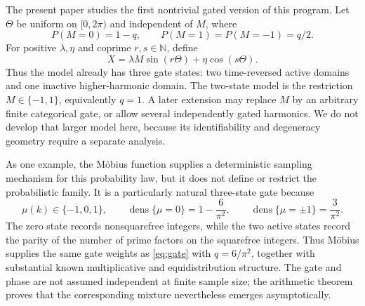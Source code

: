 \documentclass[11pt]{amsart}
\numberwithin{equation}{section}\setcounter{tocdepth}{3}\setcounter{secnumdepth}{3}
\begin{document}
The present paper studies the first nontrivial gated version of this program.  Let
$\Theta$ be uniform on $[0,2\pi)$ and independent of $M$, where
\begin{equation}P(M=0)=1-q,\qquad P(M=1)=P(M=-1)=q/2.\label{eq:gate}\end{equation}
For positive $\lambda,\eta$ and coprime $r,s\in\mathbb N$, define
\begin{equation}X=\lambda M\sin(r\Theta)+\eta\cos(s\Theta).\label{eq:X}\end{equation}
Thus the model already has three gate states: two time-reversed active domains and one
inactive higher-harmonic domain.  The two-state model is the restriction
$M\in\{-1,1\}$, equivalently $q=1$.  A later extension may replace $M$ by an arbitrary
finite categorical gate, or allow several independently gated harmonics.  We do not
develop that larger model here, because its identifiability and degeneracy geometry
require a separate analysis.

As one example, the Möbius function supplies a deterministic sampling mechanism for this
probability law, but it does not define or restrict the probabilistic family.  It is a
particularly natural three-state gate because
\begin{equation}
 \mu(k)\in\{-1,0,1\},\qquad
 \operatorname{dens}\{\mu=0\}=1-\frac{6}{\pi^2},\qquad
 \operatorname{dens}\{\mu=\pm1\}=\frac{3}{\pi^2}.
 \label{eq:mobius_three_state_densities}
\end{equation}
The zero state records nonsquarefree integers, while the two active states record the
parity of the number of prime factors on the squarefree integers.  Thus Möbius supplies
the same gate weights as \eqref{eq:gate} with $q=6/\pi^2$, together with substantial
known multiplicative and equidistribution structure.  The gate and phase are not assumed
independent at finite sample size; the arithmetic theorem proves that the corresponding
mixture nevertheless emerges asymptotically.
\end{document}
